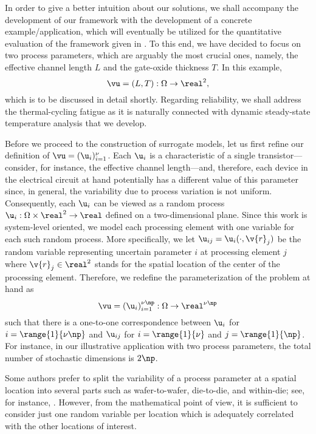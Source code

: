 In order to give a better intuition about our solutions, we shall accompany the
development of our framework with the development of a concrete
example/application, which will eventually be utilized for the quantitative
evaluation of the framework given in . To this end,
we have decided to focus on two process parameters, which are arguably the most
crucial ones, namely, the effective channel length $L$ and the gate-oxide
thickness $T$. In this example,
\[
  \vu = (L, T): \Omega \to \real^2,
\]
which is to be discussed in detail shortly. Regarding reliability, we shall
address the thermal-cycling fatigue as it is naturally connected with dynamic
steady-state temperature analysis that we develop.

Before we proceed to the construction of surrogate models, let us first refine
our definition of $\vu = (\u_i)_{i = 1}^\nu$. Each $\u_i$ is a characteristic of
a single transistor---consider, for instance, the effective channel
length---and, therefore, each device in the electrical circuit at hand
potentially has a different value of this parameter since, in general, the
variability due to process variation is not uniform. Consequently, each $\u_i$
can be viewed as a random process $\u_i: \Omega \times \real^2 \to \real$
defined on a two-dimensional plane. Since this work is system-level oriented, we
model each processing element with one variable for each such random process.
More specifically, we let $\u_{ij} = \u_i(\cdot, \v{r}_j)$ be the random
variable representing uncertain parameter $i$ at processing element $j$ where
$\v{r}_j \in \real^2$ stands for the spatial location of the center of the
processing element. Therefore, we redefine the parameterization \vu of the
problem at hand as
\[
  \vu = (\u_i)_{i = 1}^{\nu \np}: \Omega \to \real^{\nu \np}
\]
such that there is a one-to-one correspondence between $\u_i$ for $i =
\range{1}{\nu \np}$ and $\u_{ij}$ for $i = \range{1}{\nu}$ and $j =
\range{1}{\np}$. For instance, in our illustrative application with two process
parameters, the total number of stochastic dimensions is $2 \np$.

\begin{remark}
Some authors prefer to split the variability of a process parameter at a spatial
location into several parts such as wafer-to-wafer, die-to-die, and within-die;
see, for instance, \cite{juan2012}. However, from the mathematical point of
view, it is sufficient to consider just one random variable per location which
is adequately correlated with the other locations of interest.
\end{remark}

